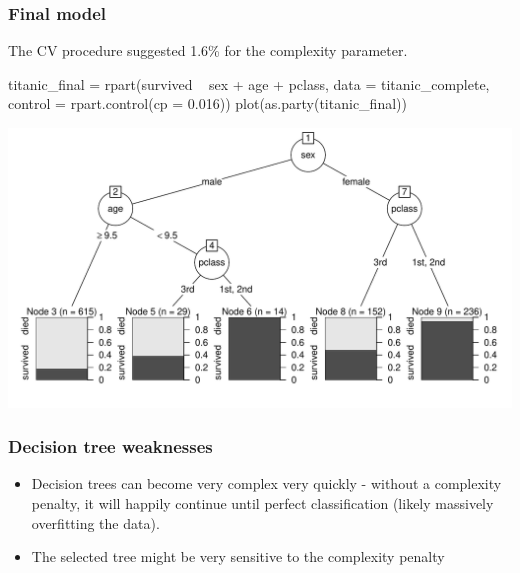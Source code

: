 \documentclass[a4paper]{article}\usepackage[]{graphicx}\usepackage[]{xcolor}
\begin{document}
\subsubsection{Final model}
The CV procedure suggested 1.6\% for the complexity parameter.
\begin{Schunk}
\begin{Sinput}
titanic_final = rpart(survived ~ sex + age + pclass, data = titanic_complete, 
                      control = rpart.control(cp = 0.016))
plot(as.party(titanic_final))
\end{Sinput}


{\centering \includegraphics[width=0.95\linewidth]{figure/listings-unnamed-chunk-446-1} 

}

\end{Schunk}
\subsubsection{Decision tree weaknesses}
\begin{itemize}
	\item Decision trees can become very complex very quickly - without a complexity penalty, it will happily continue until perfect classification (likely massively overfitting the data).
	\item The selected tree might be very sensitive to the complexity penalty
\end{itemize}
\end{document}
